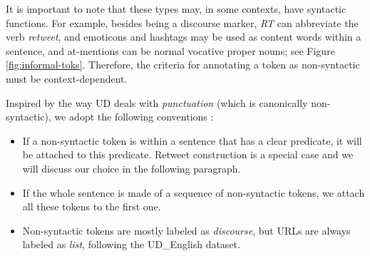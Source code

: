 \documentclass[11pt,a4paper]{article}
\newcommand{\yjcomment}[1]{\textcolor{orange}{[$_\mathrm{L}^\mathrm{Y}$#1]}}
\newcommand{\nascomment}[1]{\textcolor{blue}{[#1 ---\textsc{nas}]}}
\newcommand{\yicomment}[1]{\textcolor{gray}{[#1 ---\textsc{yi}]}}
\begin{document}
It is important to note that these types may, in some
contexts, have syntactic functions.
For example, besides being a discourse marker, \emph{RT} can
abbreviate the verb {\it retweet}, and emoticons and hashtags may be
used as content words within a sentence, and at-mentions can be normal vocative proper nouns; see Figure
\ref{fig:informal-toks}.  Therefore, the criteria for annotating a
token as non-syntactic must be context-dependent.


Inspired by the way UD deals with \emph{punctuation} (which is
canonically non-syntactic), we adopt the following
conventions%
:

\begin{itemize}
\item If a non-syntactic token is within a sentence that has a clear predicate, it will be attached to this predicate. Retweet construction is a special case and we will discuss our choice in the following paragraph.
\item If the whole sentence is made of a sequence of non-syntactic tokens, we attach all these tokens to the first one.
\item Non-syntactic tokens are mostly labeled as {\it discourse}, but
  URLs are always labeled as {\it list}, following the UD\_English dataset.%
\end{itemize}
\end{document}
